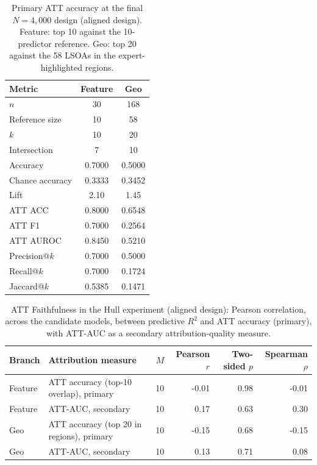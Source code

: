\begin{table}[H]
\centering
\caption{Primary ATT accuracy at the final $N=4{,}000$ design (aligned design). Feature: top 10 against the 10-predictor reference. Geo: top 20 against the 58 LSOAs in the expert-highlighted regions.}
\label{tab:hull_att_accuracy_primary_aligned}
\small
\begin{tabular}{lcc}
\toprule
Metric & Feature & Geo \\
\midrule
$n$ & 30 & 168 \\
Reference size & 10 & 58 \\
$k$ & 10 & 20 \\
Intersection & 7 & 10 \\
Accuracy & 0.7000 & 0.5000 \\
Chance accuracy & 0.3333 & 0.3452 \\
Lift & 2.10 & 1.45 \\
ATT ACC & 0.8000 & 0.6548 \\
ATT F1 & 0.7000 & 0.2564 \\
ATT AUROC & 0.8450 & 0.5210 \\
Precision@$k$ & 0.7000 & 0.5000 \\
Recall@$k$ & 0.7000 & 0.1724 \\
Jaccard@$k$ & 0.5385 & 0.1471 \\
\bottomrule
\end{tabular}
\end{table}

\begin{table}[H]
\centering
\caption{ATT Faithfulness in the Hull experiment (aligned design): Pearson correlation, across the candidate models, between predictive $R^2$ and ATT accuracy (primary), with ATT-AUC as a secondary attribution-quality measure.}
\label{tab:hull_faithfulness_correlation_aligned}
\small
\begin{tabular}{llrrrr}
\toprule
Branch & Attribution measure & $M$ & Pearson $r$ & Two-sided $p$ & Spearman $\rho$ \\
\midrule
Feature & ATT accuracy (top-10 overlap), primary & 10 & -0.01 & 0.98 & -0.01 \\
Feature & ATT-AUC, secondary & 10 & 0.17 & 0.63 & 0.30 \\
Geo & ATT accuracy (top 20 in regions), primary & 10 & -0.15 & 0.68 & -0.15 \\
Geo & ATT-AUC, secondary & 10 & 0.13 & 0.71 & 0.08 \\
\bottomrule
\end{tabular}
\end{table}

